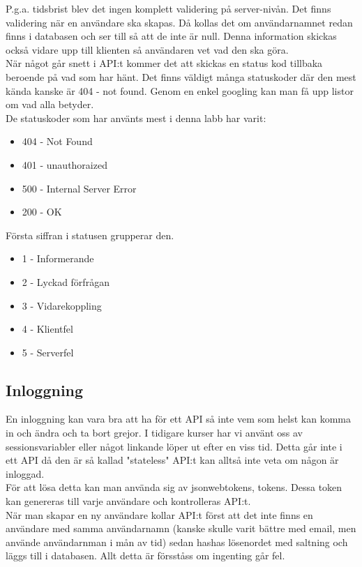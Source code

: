 \documentclass{article}
\begin{document}
\noindent
P.g.a. tidsbrist blev det ingen komplett validering på server-nivån. Det finns validering när en användare ska skapas. Då kollas det om användarnamnet redan finns i databasen och ser till så att de inte är null. Denna information skickas också vidare upp till klienten så användaren vet vad den ska göra.\\

\noindent
När något går snett i API:t kommer det att skickas en status kod tillbaka beroende på vad som har hänt.
Det finns väldigt många statuskoder där den mest kända kanske är 404 - not found. Genom en enkel googling kan man få upp listor om vad alla betyder.\\
De statuskoder som har använts mest i denna labb har varit:
\begin{itemize}
	\item 404 - Not Found
	\item 401 - unauthoraized
	\item 500 - Internal Server Error
	\item 200 - OK
\end{itemize}
Första siffran i statusen grupperar den. 
\begin{itemize}
	\item 1 - Informerande 
	\item 2 - Lyckad förfrågan
	\item 3 - Vidarekoppling
	\item 4 - Klientfel
	\item 5 - Serverfel
\end{itemize}
\subsection{Inloggning}%
\label{sub:inloggning}
En inloggning kan vara bra att ha för ett API så inte vem som helst kan komma in och ändra och ta bort grejor. I tidigare kurser har vi använt oss av sessionsvariabler eller något linkande löper ut efter en viss tid. Detta går inte i ett API då den är så kallad "stateless" API:t kan alltså inte veta om någon är inloggad.\\

\noindent
För att lösa detta kan man använda sig av jsonwebtokens, tokens. Dessa token kan genereras till varje användare och kontrolleras API:t.\\

\noindent
När man skapar en ny användare kollar API:t först att det inte finns en användare med samma användarnamn (kanske skulle varit bättre med email, men använde användarnman i mån av tid)
sedan hashas lösenordet med saltning och läggs till i databasen. Allt detta är försståss om ingenting går fel.\\
\end{document}
